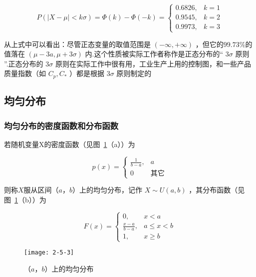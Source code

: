 \begin{equation}
P(|X-\mu|<k \sigma)=\Phi(k)-\Phi(-k)=\left\{\begin{array}{ll}{0.6826,} & {k=1} \\ {0.9545,} & {k=2} \\ {0.9973,} & {k=3}\end{array}\right. \label{eq:2.5.5}
\end{equation}

从上式中可以看出：尽管正态变量的取值范围是 $(-\infty,+\infty)$ ，但它的$ 99.73\% $的值落在 $(\mu-3 a, \mu+3 \sigma)$ 内.这个性质被实际工作者称作是正态分布的“ $ 3\sigma $ 原则 ”.正态分布的 $ 3\sigma $ 原则在实际工作中很有用，工业生产上用的控制图，和一些产品质量指数（如 $C_{p}, C_{*}$ ）都是根据 $ 3\sigma $ 原则制定的


\subsection{均匀分布}

\subsubsection{均匀分布的密度函数和分布函数}

若随机变量X的密度函数（见图~\ref{fig:2-5-3}（a））为

\begin{equation}
p(x)=\left\{
\begin{array}{ll}
{\frac{1}{b-a},} & {a}        \\ 
{0}              &{\text{其它}}
\end{array}
\right. \label{eq:2.5.6}
\end{equation}

则称$ X $服从区间$ （a，b） $上的均匀分布，记作 $X \sim U(a, b)$ ，其分布函数（见图~\ref{fig:2-5-3}（b））为

\begin{equation}
F(x)=\left\{
\begin{array}{ll}
{0,} & {x<a} \\ 
{\frac{x-a}{b-a},} & {a \leqslant x<b} \\ 
{1,} & {x \geqslant b}
\end{array}
\right. \label{eq:2.5.7}
\end{equation}

\begin{figure}
	\centering
	\texttt{[image: 2-5-3]}
	\caption{$ （a，b） $上的均匀分布}
	\label{fig:2-5-3}
\end{figure}

